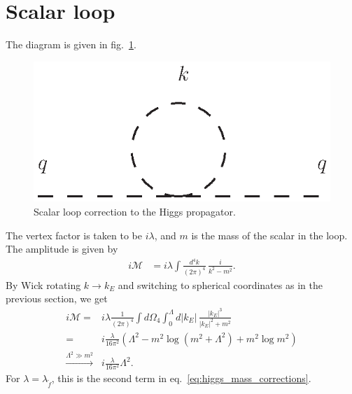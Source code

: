 \documentclass[twoside,english]{uiofysmaster}
\begin{document}
\section{Scalar loop}
The diagram is given in fig.\ \ref{fig:appendix_higgs_stop_loop}.
\begin{figure}[hbt]
\centering
\includegraphics[scale=1]{figures/appendix/higgs_stop_loop_with_momenta.eps}
\caption{Scalar loop correction to the Higgs propagator.}
\label{fig:appendix_higgs_stop_loop}
\end{figure}
The vertex factor is taken to be $i\lambda$, and $m$ is the mass of the scalar in the loop. The amplitude is given by
\begin{align}
	i\mathcal{M} &= i\lambda \int \frac{d^4k}{(2\pi)^4}\, \frac{i}{k^2-m^2}.
\end{align}
By Wick rotating $k\to k_E$ and switching to spherical coordinates as in the previous section, we get
\begin{align}
	i\mathcal{M}= &i\lambda \frac{1}{(2\pi)^4}\int d\Omega_4 \int_0^\Lambda d|k_E| \, \frac{|k_E|^3}{|k_E|^2 + m^2}\nonumber\\
				= &i\frac{\lambda}{16\pi^2} \left(\Lambda^2- m^2 \log(m^2 + \Lambda^2) + m^2\log m^2 \right)\\
				\overset{\Lambda^2 \gg m^2}{\to} &i\frac{\lambda}{16\pi^2} \Lambda^2.\nonumber
\end{align}
For $\lambda = \lambda_{\tilde f}$, this is the second term in eq.\ \eqref{eq:higgs_mass_corrections}.




\end{document}
